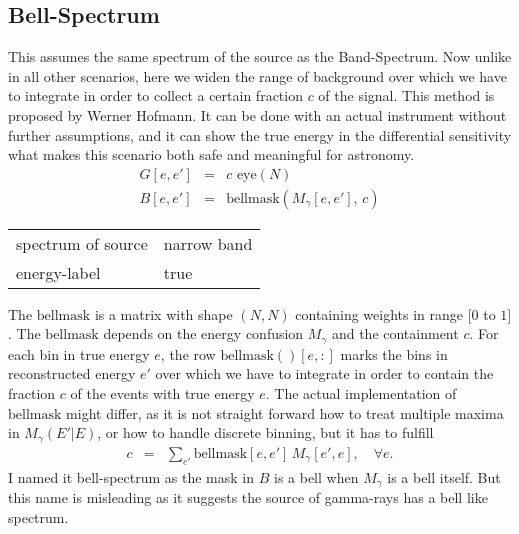 \documentclass{article}%
\begin{document}
\subsection{Bell-Spectrum}
%
This assumes the same spectrum of the source as the Band-Spectrum.
%
Now unlike in all other scenarios, here we widen the range of background over which we have to integrate in order to collect a certain fraction $c$ of the signal.
%
This method is proposed by Werner Hofmann.
%
It can be done with an actual instrument without further assumptions, and it can show the true energy in the differential sensitivity what makes this scenario both safe and meaningful for astronomy.
%
\begin{eqnarray}
G[e, e'] &=& c \, \, \mathrm{eye}(N)
\\
B[e, e'] &=& \mathrm{bellmask}(M_{\gamma}[e, e'], \, c)
\end{eqnarray}
%
\begin{center}
\begin{tabular}{ll}
spectrum of source & narrow band\\
energy-label & true\\
\end{tabular}
\end{center}
%
The $\mathrm{bellmask}$ is a matrix with shape $(N,N)$ containing weights in range $[0$ to $1]$.
%
The $\mathrm{bellmask}$ depends on the energy confusion $M_{\gamma}$ and the containment $c$.
%
For each bin in true energy $e$, the row $\mathrm{bellmask}()[e, :]$ marks the bins in reconstructed energy $e'$ over which we have to integrate in order to contain the fraction $c$ of the events with true energy $e$.
%
The actual implementation of $\mathrm{bellmask}$ might differ, as it is not straight forward how to treat multiple maxima in $M_\gamma(E'\vert E)$, or how to handle discrete binning, but it has to fulfill
%
\begin{eqnarray}
c &=& \sum_{e'} \mathrm{bellmask}[e ,e'] \, M_{\gamma}[e', e], \,\,\,\,\,\, \forall e.
\end{eqnarray}
%
I named it bell-spectrum as the mask in $B$ is a bell when $M_\gamma$ is a bell itself. But this name is misleading as it suggests the source of gamma-rays has a bell like spectrum.
%
%
%
\end{document}
